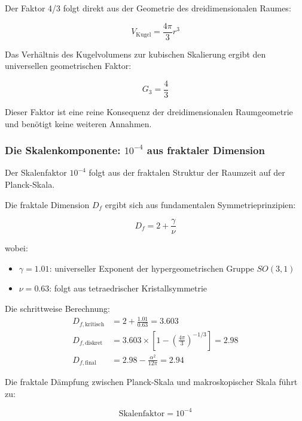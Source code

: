 \documentclass[12pt,a4paper]{article}
\theoremstyle{definition}
\begin{document}
Der Faktor 4/3 folgt direkt aus der Geometrie des dreidimensionalen Raumes:

\begin{equation}
	V_{\text{Kugel}} = \frac{4\pi}{3} r^3
\end{equation}

Das Verhältnis des Kugelvolumens zur kubischen Skalierung ergibt den universellen geometrischen Faktor:

\begin{equation}
	G_3 = \frac{4}{3}
\end{equation}

Dieser Faktor ist eine reine Konsequenz der dreidimensionalen Raumgeometrie und benötigt keine weiteren Annahmen.

\subsubsection{Die Skalenkomponente: $10^{-4}$ aus fraktaler Dimension}

Der Skalenfaktor $10^{-4}$ folgt aus der fraktalen Struktur der Raumzeit auf der Planck-Skala.

Die fraktale Dimension $D_f$ ergibt sich aus fundamentalen Symmetrieprinzipien:

\begin{equation}
	D_f = 2 + \frac{\gamma}{\nu}
\end{equation}

wobei:
\begin{itemize}
	\item $\gamma = 1.01$: universeller Exponent der hypergeometrischen Gruppe $SO(3,1)$
	\item $\nu = 0.63$: folgt aus tetraedrischer Kristallsymmetrie
\end{itemize}

Die schrittweise Berechnung:
\begin{align}
	D_{f,\text{kritisch}} &= 2 + \frac{1.01}{0.63} = 3.603\\
	D_{f,\text{diskret}} &= 3.603 \times \left[1 - \left(\frac{4\pi}{3}\right)^{-1/3}\right] = 2.98\\
	D_{f,\text{final}} &= 2.98 - \frac{\alpha^2}{12\pi} = 2.94
\end{align}

Die fraktale Dämpfung zwischen Planck-Skala und makroskopischer Skala führt zu:

\begin{equation}
	\text{Skalenfaktor} = 10^{-4}
\end{equation}
\end{document}
